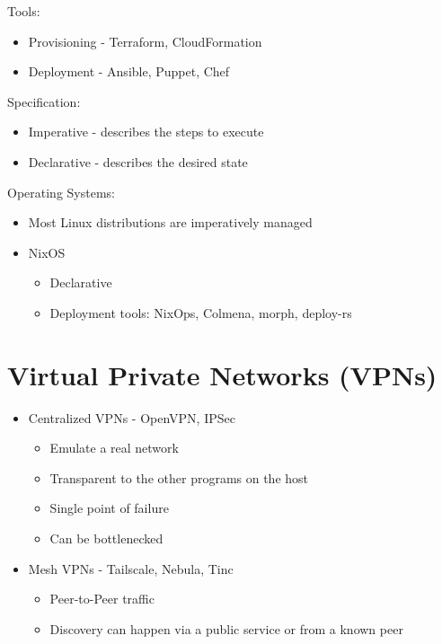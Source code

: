 Tools:

\begin{itemize}
\tightlist
\item
  Provisioning - Terraform, CloudFormation
\item
  Deployment - Ansible, Puppet, Chef
\end{itemize}

Specification:

\begin{itemize}
\tightlist
\item
  Imperative - describes the steps to execute
\item
  Declarative - describes the desired state
\end{itemize}

Operating Systems:

\begin{itemize}
\tightlist
\item
  Most Linux distributions are imperatively managed
\item
  NixOS

  \begin{itemize}
  \tightlist
  \item
    Declarative
  \item
    Deployment tools: NixOps, Colmena, morph, deploy-rs
  \end{itemize}
\end{itemize}

\hypertarget{virtual-private-networks-vpns}{%
\part{Virtual Private Networks
(VPNs)}\label{virtual-private-networks-vpns}}

\begin{itemize}
\tightlist
\item
  Centralized VPNs - OpenVPN, IPSec

  \begin{itemize}
  \tightlist
  \item
    Emulate a real network
  \item
    Transparent to the other programs on the host
  \item
    Single point of failure
  \item
    Can be bottlenecked
  \end{itemize}
\item
  Mesh VPNs - Tailscale, Nebula, Tinc

  \begin{itemize}
  \tightlist
  \item
    Peer-to-Peer traffic
  \item
    Discovery can happen via a public service or from a known peer
  \end{itemize}
\end{itemize}

